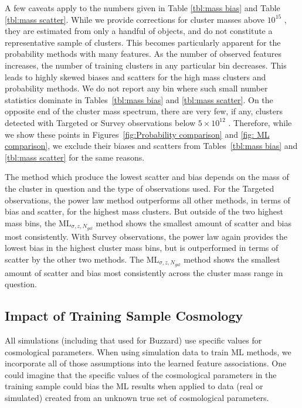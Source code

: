 \documentclass[fleqn,usenatbib]{mnras}
\begin{document}
A few caveats apply to the numbers given in Table \ref{tbl:mass bias} and Table \ref{tbl:mass scatter}. While we provide corrections for cluster masses above $10^{15}$ \msol, they are estimated from only a handful of objects, and do not constitute a representative sample of clusters. This becomes particularly apparent for the probability methods with many features. As the number of observed features increases, the number of training clusters in any particular bin decreases. This leads to highly skewed biases and scatters for the high mass clusters and probability methods. We do not report any bin where such small number statistics dominate in Tables~\ref{tbl:mass bias} and \ref{tbl:mass scatter}. On the opposite end of the cluster mass spectrum, there are very few, if any, clusters detected with Targeted or Survey observations below $5\times10^{12}$ \msol. Therefore, while we show these points in Figures~\ref{fig:Probability comparison} and \ref{fig: ML comparison}, we exclude their biases and scatters from Tables~\ref{tbl:mass bias} and \ref{tbl:mass scatter} for the same reasons. 
 
The method which produce the lowest scatter and bias depends on the mass of the cluster in question and the type of observations used. For the Targeted observations, the power law method outperforms all other methods, in terms of bias and scatter, for the highest mass clusters. But outside of the two highest mass bins, the $\mathrm{ML}_{\sigma, z, N_{gal}}$ method shows the smallest amount of scatter and bias most consistently. With Survey observations, the power law again provides the lowest bias in the highest cluster mass bins, but is outperformed in terms of scatter by the other two methods. The $\mathrm{ML}_{\sigma, z, N_{gal}}$ method shows the smallest amount of scatter and bias most consistently across the cluster mass range in question.
 
\subsection{Impact of Training Sample Cosmology}
All simulations (including that used for Buzzard) use specific values for cosmological parameters. When using simulation data to train ML methods, we incorporate all of those assumptions into the learned feature associations. One could imagine that the specific values of the cosmological parameters in the training sample could bias the ML results when applied to data (real or simulated) created from an unknown true set of cosmological parameters. 
\end{document}
